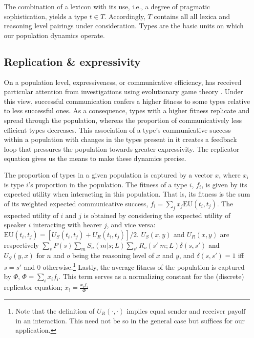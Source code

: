 \documentclass[a4paper]{article}
\begin{document}
The combination of a lexicon with its use, i.e., a degree of pragmatic sophistication, yields a type $t \in T$. Accordingly, $T$ contains all all lexica and reasoning level pairings under consideration. Types are the basic units on which our population dynamics operate. 

\subsection{Replication \& expressivity}
On a population level, expressiveness, or communicative efficiency, has received particular attention from investigations using evolutionary game theory \citep{nowak+krakauer:1999,nowak+etal:2000, nowak+etal:2002}. Under this view, successful communication confers a higher fitness to some types relative to less successful ones. As a consequence, types with a higher fitness replicate and spread through the population, whereas the proportion of communicatively less efficient types decreases. This association of a type's communicative success within a population with changes in the types present in it creates a feedback loop that pressures the population towards greater expressivity. The replicator equation gives us the means to make these dynamics precise.

The proportion of types in a given population is captured by a vector $x$, where $x_i$ is type $i$'s proportion in the population. The fitness of a type $i$, $f_i$, is given by its expected utility when interacting in this population. That is, its fitness is the sum of its weighted expected communicative success, $f_i = \sum_j x_j \text{EU}(t_i,t_j)$. The expected utility of $i$ and $j$ is obtained by considering the expected utility of speaker $i$ interacting with hearer $j$, and vice versa: $\text{EU}(t_i,t_j) = [U_S(t_i,t_j) + U_R(t_i,t_j)]/2$. $U_S(x,y)$ and $U_R(x,y)$ are respectively $\sum_s P(s)\sum_m S_n(m|s;L) \sum_{s'} R_o(s'|m;L) \delta(s,s')$ and $U_S(y,x)$ for $n$ and $o$ being the reasoning level of $x$ and $y$, and $\delta(s,s') = 1$ iff $s = s'$ and $0$ otherwise.\footnote{Note that the definition of $U_R(\cdot,\cdot)$ implies equal sender and receiver payoff in an interaction. This need not be so in the general case but suffices for our application.} Lastly, the average fitness of the population is captured by $\Phi$, $\Phi = \sum_i x_i f_i$. This term serves as a normalizing constant for the (discrete) replicator equation; $\dot{x}_i = \frac{x_i f_i}{\Phi}$ 
\end{document}
